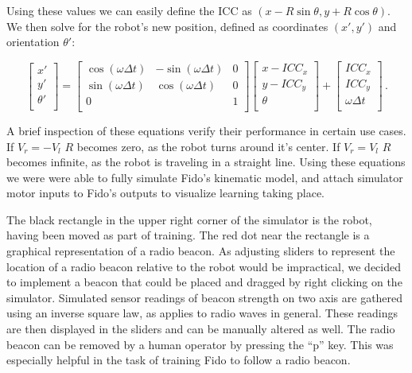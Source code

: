 Using these values we can easily define the ICC as $(x - R\sin\theta,y + R\cos\theta)$.  We then solve for the robot's new position, defined as coordinates $(x',y')$ and orientation $\theta'$:

\begin{equation}
	\begin{bmatrix}
	    x'      \\
	    y'      \\
	    \theta' \\
	\end{bmatrix} =
	\begin{bmatrix}
		\cos(\omega\Delta t) & -\sin(\omega\Delta t) & 0 \\
		\sin(\omega\Delta t) & \cos(\omega\Delta t)  & 0 \\
		0                    &                       & 1 \\
	\end{bmatrix}
	\begin{bmatrix}
		x - ICC_x  \\
		y - ICC_y  \\
		\theta     \\
	\end{bmatrix} + 
	\begin{bmatrix}
		ICC_x          \\
		ICC_y          \\
		\omega\Delta t \\
	\end{bmatrix} \,.
\end{equation}

A brief inspection of these equations verify their performance in certain use cases.  If $V_r = -V_l$ $R$ becomes zero, as the robot turns around it's center.  If $V_r = V_l$ $R$ becomes infinite, as the robot is traveling in a straight line.  Using these equations we were were able to fully simulate Fido's kinematic model, and attach simulator motor inputs to Fido's outputs to visualize learning taking place.   

The black rectangle in the upper right corner of the simulator is the robot, having been moved as part of training.  The red dot near the rectangle is a graphical representation of a radio beacon.  As adjusting sliders to represent the location of a radio beacon relative to the robot would be impractical, we decided to implement a beacon that could be placed and dragged by right clicking on the simulator.  Simulated sensor readings of beacon strength on two axis are gathered using an inverse square law, as applies to radio waves in general.  These readings are then displayed in the sliders and can be manually altered as well.  The radio beacon can be removed by a human operator by pressing the ``p'' key.  This was especially helpful in the task of training Fido to follow a radio beacon.

